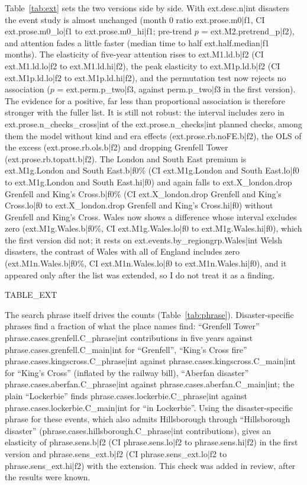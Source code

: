 \documentclass[11pt,a4paper]{article}
\begin{document}
Table~\ref{tab:ext} sets the two versions side by side. With {{ext.desc.n|int}} disasters the event study is almost unchanged (month 0 ratio {{ext.prose.m0|f1}}, CI {{ext.prose.m0_lo|f1}} to {{ext.prose.m0_hi|f1}}; pre-trend $p$ = {{ext.M2.pretrend_p|f2}}), and attention fades a little faster (median time to half {{ext.half.median|f1}} months). The elasticity of five-year attention rises to {{ext.M1.ld.b|f2}} (CI {{ext.M1.ld.lo|f2}} to {{ext.M1.ld.hi|f2}}), the peak elasticity to {{ext.M1p.ld.b|f2}} (CI {{ext.M1p.ld.lo|f2}} to {{ext.M1p.ld.hi|f2}}), and the permutation test now rejects no association ($p$ = {{ext.perm.p_two|f3}}, against {{perm.p_two|f3}} in the first version). The evidence for a positive, far less than proportional association is therefore stronger with the fuller list. It is still not robust: the interval includes zero in {{ext.prose.n_checks_cross|int}} of the {{ext.prose.n_checks|int}} planned checks, among them the model without kind and era effects ({{ext.prose.rb.noFE.b|f2}}), the OLS of the excess ({{ext.prose.rb.ols.b|f2}}) and dropping Grenfell Tower ({{ext.prose.rb.topatt.b|f2}}). The London and South East premium is {{ext.M1g.London and South East.b|f0}}\% (CI {{ext.M1g.London and South East.lo|f0}} to {{ext.M1g.London and South East.hi|f0}}) and again falls to {{ext.X_london.drop Grenfell and King's Cross.b|f0}}\% (CI {{ext.X_london.drop Grenfell and King's Cross.lo|f0}} to {{ext.X_london.drop Grenfell and King's Cross.hi|f0}}) without Grenfell and King's Cross. Wales now shows a difference whose interval excludes zero ({{ext.M1g.Wales.b|f0}}\%, CI {{ext.M1g.Wales.lo|f0}} to {{ext.M1g.Wales.hi|f0}}), which the first version did not; it rests on {{ext.events.by_regiongrp.Wales|int}} Welsh disasters, the contrast of Wales with all of England includes zero ({{ext.M1n.Wales.b|f0}}\%, CI {{ext.M1n.Wales.lo|f0}} to {{ext.M1n.Wales.hi|f0}}), and it appeared only after the list was extended, so I do not treat it as a finding.

{{TABLE_EXT}}

The search phrase itself drives the counts (Table~\ref{tab:phrase}). Disaster-specific phrases find a fraction of what the place names find: ``Grenfell Tower'' {{phrase.cases.grenfell.C_phrase|int}} contributions in five years against {{phrase.cases.grenfell.C_main|int}} for ``Grenfell'', ``King's Cross fire'' {{phrase.cases.kingscross.C_phrase|int}} against {{phrase.cases.kingscross.C_main|int}} for ``King's Cross'' (inflated by the railway bill), ``Aberfan disaster'' {{phrase.cases.aberfan.C_phrase|int}} against {{phrase.cases.aberfan.C_main|int}}; the plain ``Lockerbie'' finds {{phrase.cases.lockerbie.C_phrase|int}} against {{phrase.cases.lockerbie.C_main|int}} for ``in Lockerbie''. Using the disaster-specific phrase for these events, which also admits Hillsborough through ``Hillsborough disaster'' ({{phrase.cases.hillsborough.C_phrase|int}} contributions), gives an elasticity of {{phrase.sens.b|f2}} (CI {{phrase.sens.lo|f2}} to {{phrase.sens.hi|f2}}) in the first version and {{phrase.sens_ext.b|f2}} (CI {{phrase.sens_ext.lo|f2}} to {{phrase.sens_ext.hi|f2}}) with the extension. This check was added in review, after the results were known.
\end{document}
